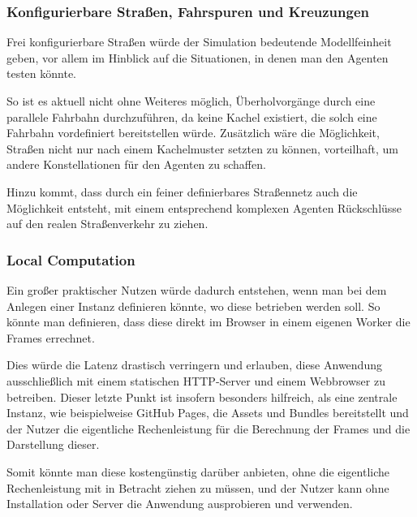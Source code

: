 \subsubsection{Konfigurierbare Straßen, Fahrspuren und Kreuzungen}

Frei konfigurierbare Straßen würde der Simulation bedeutende Modellfeinheit geben, vor allem im Hinblick auf die Situationen, in denen man den Agenten testen könnte.

So ist es aktuell nicht ohne Weiteres möglich, Überholvorgänge durch eine parallele Fahrbahn durchzuführen, da keine Kachel existiert, die solch eine Fahrbahn vordefiniert bereitstellen würde.
Zusätzlich wäre die Möglichkeit, Straßen nicht nur nach einem Kachelmuster setzten zu können, vorteilhaft, um andere Konstellationen für den Agenten zu schaffen.

Hinzu kommt, dass durch ein feiner definierbares Straßennetz auch die Möglichkeit entsteht, mit einem entsprechend komplexen Agenten Rückschlüsse auf den realen Straßenverkehr zu ziehen.

\subsubsection{Local Computation} \label{sec:fnc-impr-local-computation}

Ein großer praktischer Nutzen würde dadurch entstehen, wenn man bei dem Anlegen einer Instanz definieren könnte, wo diese betrieben werden soll.
So könnte man definieren, dass diese direkt im Browser in einem eigenen Worker die Frames errechnet.

Dies würde die Latenz drastisch verringern und erlauben, diese Anwendung ausschließlich mit einem statischen HTTP-Server und einem Webbrowser zu betreiben.
Dieser letzte Punkt ist insofern besonders hilfreich, als eine zentrale Instanz, wie beispielweise GitHub Pages, die Assets und Bundles bereitstellt und der Nutzer die eigentliche Rechenleistung für die Berechnung der Frames und die Darstellung dieser.

Somit könnte man diese kostengünstig darüber anbieten, ohne die eigentliche Rechenleistung mit in Betracht ziehen zu müssen, und der Nutzer kann ohne Installation oder Server die Anwendung ausprobieren und verwenden.
